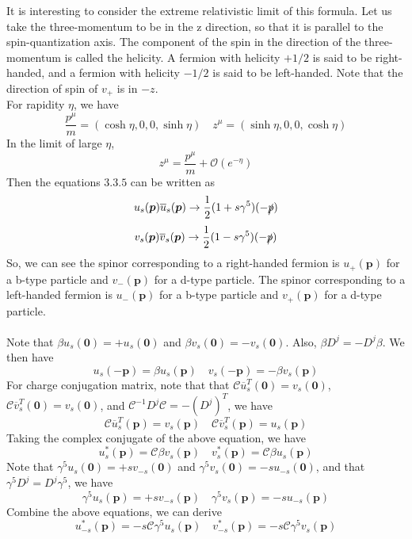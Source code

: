\documentclass[cyan]{elegantnote}
\begin{document}
\noindent
It is interesting to consider the extreme relativistic limit of this formula. Let us take the three-momentum to be in the z direction, so that it is parallel to the spin-quantization axis. The component of the spin in the direction of the three-momentum is called the helicity. A fermion with helicity $+1/2$ is said to be right-handed, and a fermion with helicity $-1/2$ is said to be left-handed. Note that the direction of spin of $v_+$ is in $-z$.\\  
For rapidity $\eta$, we have
\[\frac{p^{\mu}}{m} = (\cosh \eta, 0, 0, \sinh \eta) \quad z^{\mu} = (\sinh \eta, 0, 0, \cosh \eta)\]
In the limit of large $\eta$,
\[z^{\mu} = \frac{p^{\mu}}{m} + \mathcal{O}(e^{-\eta})\]
Then the equations $3.3.5$ can be written as
\[u_s(\bm{p}) \overline{u}_s(\bm{p})  \to \frac{1}{2}(1+s\gamma^5)(-\slashed{p})\]
\[v_s(\bm{p}) \overline{v}_s(\bm{p})  \to \frac{1}{2}(1-s\gamma^5)(-\slashed{p})\]
So, we can see the spinor corresponding to a right-handed fermion  is $u_+(\bm{p})$ for a b-type particle and $v_-({\bm{p}})$ for a d-type particle.  The spinor corresponding to a left-handed fermion  is $u_-(\bm{p})$ for a b-type particle and $v_+(\bm{p})$ for a d-type particle.\\ \\
Note that $\beta u_s(\bm{0}) = + u_s(\bm{0})$ and $\beta v_s(\bm{0}) = -v_s(\bm{0})$. Also, $\beta D^j = - D^j \beta$. We then have
\[u_s(-\bm{p}) = \beta u_s(\bm{p}) \quad v_s(-\bm{p}) = -\beta v_s(\bm{p})\]
For charge conjugation matrix, note that that $\mathcal{C} \overline{u}^T_s(\bm{0}) = v_s(\bm{0})$, $\mathcal{C} \overline{v}^T_s(\bm{0}) = v_s(\bm{0})$, and $\mathcal{C}^{-1} D^j \mathcal{C} = - (D^j)^T$, we have
\[\mathcal{C} \overline{u}^T_s(\bm{p}) = v_s(\bm{p}) \quad \mathcal{C} \overline{v}^T_s(\bm{p}) = u_s(\bm{p})\]
Taking the complex conjugate of the above equation, we have
\[u^*_s(\bm{p}) = \mathcal{C}\beta v_s(\bm{p}) \quad v^*_s(\bm{p}) = \mathcal{C}\beta u_s(\bm{p})\]
Note that $\gamma^5 u_{s}(\bm{0}) = +s v_{-s}(\bm{0})$ and $\gamma^5 v_{s}(\bm{0}) = -s u_{-s}(\bm{0})$, and that $\gamma^5 D^j = D^j \gamma^5$, we have
\[\gamma^5 u_{s}(\bm{p}) = +s v_{-s}(\bm{p}) \quad \gamma^5 v_{s}(\bm{p}) = -s u_{-s}(\bm{p})\]
Combine the above equations, we can derive
\[u^*_{-s}(\bm{p}) = -s\mathcal{C}\gamma^5 u_s(\bm{p}) \quad v^*_{-s}(\bm{p}) = -s\mathcal{C}\gamma^5 v_s(\bm{p})\]
\end{document}
